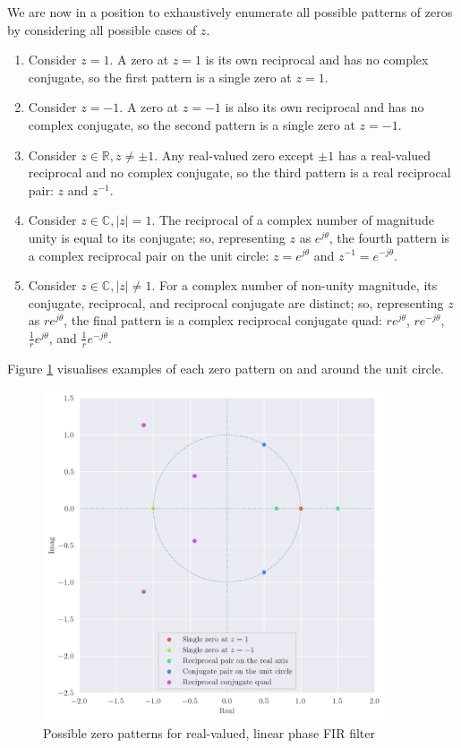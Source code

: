 \newpage

We are now in a position to exhaustively enumerate all possible patterns of zeros by considering all possible cases of $z$.
\begin{enumerate}[label=(\roman*)]
    \item Consider $z=1$. A zero at $z=1$ is its own reciprocal and has no complex conjugate, so the first pattern is a single zero at $z=1$.

    \item Consider $z=-1$. A zero at $z=-1$ is also its own reciprocal and has no complex conjugate, so the second pattern is a single zero at $z=-1$.

    \item Consider $z\in\mathbb{R},z\neq\pm 1$. Any real-valued zero except $\pm 1$ has a real-valued reciprocal and no complex conjugate, so the third pattern is a real reciprocal pair: $z$ and $z^{-1}$.

    \item Consider $z\in\mathbb{C},|z|=1$. The reciprocal of a complex number of magnitude unity is equal to its conjugate; so, representing $z$ as $e^{j\theta}$, the fourth pattern is a complex reciprocal pair on the unit circle: $z=e^{j\theta}$ and $z^{-1}=e^{-j\theta}$.

    \item Consider $z\in\mathbb{C},|z|\neq 1$. For a complex number of non-unity magnitude, its conjugate, reciprocal, and reciprocal conjugate are distinct; so, representing $z$ as $re^{j\theta}$, the final pattern is a complex reciprocal conjugate quad: $re^{j\theta}$, $re^{-j\theta}$, $\frac{1}{r}e^{j\theta}$, and $\frac{1}{r}e^{-j\theta}$.
\end{enumerate}

\bigskip

Figure \ref{fig:q1_zero_patterns} visualises examples of each zero pattern on and around the unit circle.

\begin{figure}[ht]
    \centering
    \includegraphics[width=0.9\textwidth]{images/q1_zero_patterns.png}
    \caption{Possible zero patterns for real-valued, linear phase FIR filter}
    \label{fig:q1_zero_patterns}
\end{figure}
